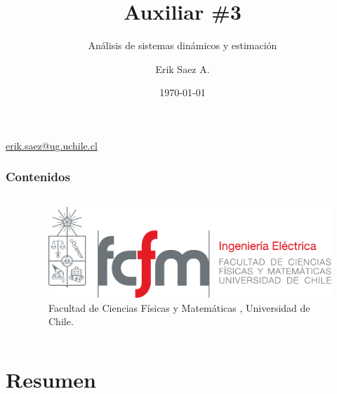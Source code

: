 \documentclass[
    10pt,
    aspectratio=169,
    xcolor={dvipsnames},
    spanish,
    ]{beamer}
\title[Auxiliar \#3]{\bfseries Auxiliar \#3}
\subtitle{Análisis de sistemas dinámicos y estimación}
\author[Erik Saez A.]{Erik Saez A.}
\institute[UChile]{Department of Electrical Engineering \\ Universidad de Chile}
\date{\today}
\begin{document}
\begin{frame}
  \titlepage
  \centering
   \href{mailto:erik.saez@ug.uchile.cl}{erik.saez@ug.uchile.cl} \hspace{.2cm}
\end{frame}

\begin{frame}
  \frametitle{Contenidos}
  \centering
  \begin{columns}
    \begin{column}{0.4\textwidth}
      \tableofcontents
    \end{column}
    \begin{column}{0.5\textwidth}
      \begin{figure}
        \centering
        \includegraphics[width=\textwidth]{fcfm_die}
        \caption{Facultad de Ciencias Físicas y Matemáticas , Universidad de Chile.}
      \end{figure}
    \end{column}
  \end{columns}  
\end{frame}

\section{Resumen}
\end{document}
